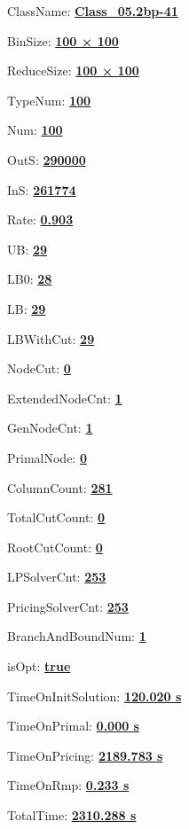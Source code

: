 \documentclass[11pt]{article}
\begin{document}
\pagestyle{empty}


ClassName: \underline{\textbf{Class_05.2bp-41}}
\par
BinSize: \underline{\textbf{100 × 100}}
\par
ReduceSize: \underline{\textbf{100 × 100}}
\par
TypeNum: \underline{\textbf{100}}
\par
Num: \underline{\textbf{100}}
\par
OutS: \underline{\textbf{290000}}
\par
InS: \underline{\textbf{261774}}
\par
Rate: \underline{\textbf{0.903}}
\par
UB: \underline{\textbf{29}}
\par
LB0: \underline{\textbf{28}}
\par
LB: \underline{\textbf{29}}
\par
LBWithCut: \underline{\textbf{29}}
\par
NodeCut: \underline{\textbf{0}}
\par
ExtendedNodeCnt: \underline{\textbf{1}}
\par
GenNodeCnt: \underline{\textbf{1}}
\par
PrimalNode: \underline{\textbf{0}}
\par
ColumnCount: \underline{\textbf{281}}
\par
TotalCutCount: \underline{\textbf{0}}
\par
RootCutCount: \underline{\textbf{0}}
\par
LPSolverCnt: \underline{\textbf{253}}
\par
PricingSolverCnt: \underline{\textbf{253}}
\par
BranchAndBoundNum: \underline{\textbf{1}}
\par
isOpt: \underline{\textbf{true}}
\par
TimeOnInitSolution: \underline{\textbf{120.020 s}}
\par
TimeOnPrimal: \underline{\textbf{0.000 s}}
\par
TimeOnPricing: \underline{\textbf{2189.783 s}}
\par
TimeOnRmp: \underline{\textbf{0.233 s}}
\par
TotalTime: \underline{\textbf{2310.288 s}}
\par
\newpage


\end{document}
